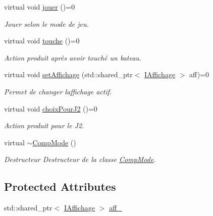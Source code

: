 \begin{DoxyCompactItemize}
virtual void \hyperlink{class_comp_mode_a81615504b7d72e0255b7fc09a991e0b5}{jouer} ()=0
\begin{DoxyCompactList}\small\item\em Jouer selon le mode de jeu. \end{DoxyCompactList}\item 
virtual void \hyperlink{class_comp_mode_a6b26d4c754fe0cc104d24d79f472b24d}{touche} ()=0
\begin{DoxyCompactList}\small\item\em Action produit après avoir touché un bateau. \end{DoxyCompactList}\item 
virtual void \hyperlink{class_comp_mode_a94119b30f5d6704464023e97b5656e9d}{set\+Affichage} (std\+::shared\+\_\+ptr$<$ \hyperlink{class_i_affichage}{I\+Affichage} $>$ aff)=0
\begin{DoxyCompactList}\small\item\em Permet de changer l\textquotesingle{}affichage actif. \end{DoxyCompactList}\item 
virtual void \hyperlink{class_comp_mode_a537f7077c642a62627ab008bc85642df}{choix\+Pour\+J2} ()=0
\begin{DoxyCompactList}\small\item\em Action produit pour le J2. \end{DoxyCompactList}\item 
virtual \hyperlink{class_comp_mode_ab18f0c9871e896d55e6b85eb8a77203d}{$\sim$\+Comp\+Mode} ()\hypertarget{class_comp_mode_ab18f0c9871e896d55e6b85eb8a77203d}{}\label{class_comp_mode_ab18f0c9871e896d55e6b85eb8a77203d}

\begin{DoxyCompactList}\small\item\em Destructeur Destructeur de la classe \hyperlink{class_comp_mode}{Comp\+Mode}. \end{DoxyCompactList}\end{DoxyCompactItemize}
\subsection*{Protected Attributes}
\begin{DoxyCompactItemize}
\item 
std\+::shared\+\_\+ptr$<$ \hyperlink{class_i_affichage}{I\+Affichage} $>$ \hyperlink{class_comp_mode_abb71bc830a23d19f68c821f4d1564488}{aff\+\_\+}
\end{DoxyCompactItemize}



